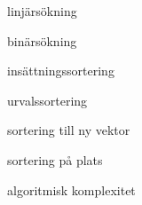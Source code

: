 \item linjärsökning
\item binärsökning
\item insättningssortering
\item urvalssortering
\item sortering till ny vektor
\item sortering på plats
\item algoritmisk komplexitet